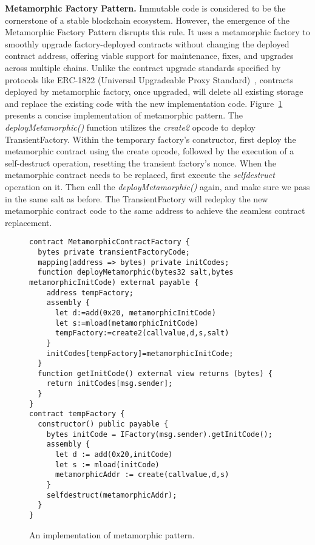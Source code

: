 \documentclass[acmsmall, screen]{acmart}
\begin{document}
	\textbf{Metamorphic Factory Pattern.} Immutable code is considered to be the cornerstone of a
	stable blockchain ecosystem. However, the emergence of the Metamorphic Factory Pattern disrupts
	this rule. It uses a metamorphic factory to smoothly upgrade factory-deployed contracts without changing
	the deployed contract address, offering viable support for maintenance, fixes, and upgrades
	across multiple chains. Unlike the contract upgrade standards specified by protocols like ERC-1822
	(Universal Upgradeable Proxy Standard)~\cite{eip-1822}, contracts deployed by metamorphic
	factory, once upgraded, will delete all existing storage and replace the existing code with the
	new implementation code. Figure~\ref{lst:metamorphic} presents a concise implementation of metamorphic
	pattern. The \textit{deployMetamorphic()} function utilizes the \textit{create2} opcode to
	deploy TransientFactory. Within the temporary factory's constructor, first deploy the
	metamorphic contract using the create opcode, followed by the execution of a self-destruct operation,
	resetting the transient factory's nonce. When the metamorphic contract needs to be replaced,
	first execute the \textit{selfdestruct} operation on it. Then call the \textit{deployMetamorphic()}
	again, and make sure we pass in the same salt as before. The TransientFactory will redeploy the new
	metamorphic contract code to the same address to achieve the seamless contract replacement.

	\begin{figure}[t]
		\begin{minipage}{0.95\linewidth}
			\begin{lstlisting}
contract MetamorphicContractFactory {
  bytes private transientFactoryCode;
  mapping(address => bytes) private initCodes;
  function deployMetamorphic(bytes32 salt,bytes metamorphicInitCode) external payable {
    address tempFactory;
    assembly {
      let d:=add(0x20, metamorphicInitCode)
      let s:=mload(metamorphicInitCode)
      tempFactory:=create2(callvalue,d,s,salt)
    }
    initCodes[tempFactory]=metamorphicInitCode;
  }
  function getInitCode() external view returns (bytes) {
    return initCodes[msg.sender];
  }
}
contract tempFactory {
  constructor() public payable {
    bytes initCode = IFactory(msg.sender).getInitCode();
    assembly {
      let d := add(0x20,initCode)
      let s := mload(initCode)
      metamorphicAddr := create(callvalue,d,s)
    }
    selfdestruct(metamorphicAddr);
  }
}
			\end{lstlisting}
		\end{minipage}
		\caption{An implementation of metamorphic pattern.}
		\label{lst:metamorphic}
	\end{figure}
\end{document}
